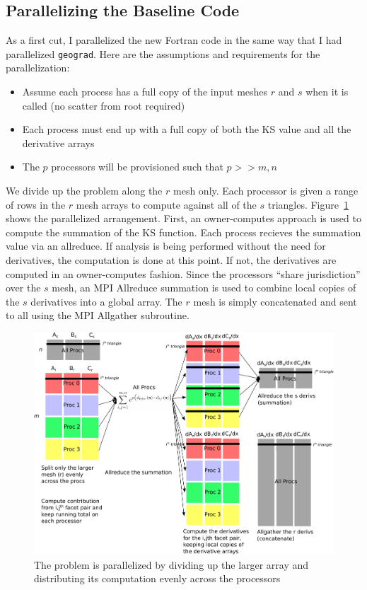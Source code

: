 \documentclass[11pt,letterpaper]{article}
\begin{document}
\subsection{Parallelizing the Baseline Code}
\qquad As a first cut, I parallelized the new Fortran code in the same way that I had parallelized \texttt{geograd}.
Here are the assumptions and requirements for the parallelization:
\begin{itemize}
  \item Assume each process has a full copy of the input meshes $r$ and $s$ when it is called (no scatter from root required)
  \item Each process must end up with a full copy of both the KS value and all the derivative arrays
  \item The $p$ processors will be provisioned such that $p >> m, n$
\end{itemize}
We divide up the problem along the $r$ mesh only.
Each processor is given a range of rows in the $r$ mesh arrays to compute against all of the $s$ triangles.
Figure~\ref{fig:parallel} shows the parallelized arrangement.
First, an owner-computes approach is used to compute the summation of the KS function.
Each process recieves the summation value via an allreduce.
If analysis is being performed without the need for derivatives, the computation is done at this point.
If not, the derivatives are computed in an owner-computes fashion.
Since the processors ``share jurisdiction'' over the $s$ mesh, an MPI Allreduce summation is used to combine local copies of the $s$ derivatives into a global array.
The $r$ mesh is simply concatenated and sent to all using the MPI Allgather subroutine.

\begin{figure}[ht]
  \centering
  \includegraphics[width=0.95\linewidth]{figures/parallelization}
  \caption{The problem is parallelized by dividing up the larger array and distributing its computation evenly across the processors}
  \label{fig:parallel}
\end{figure}
\end{document}
